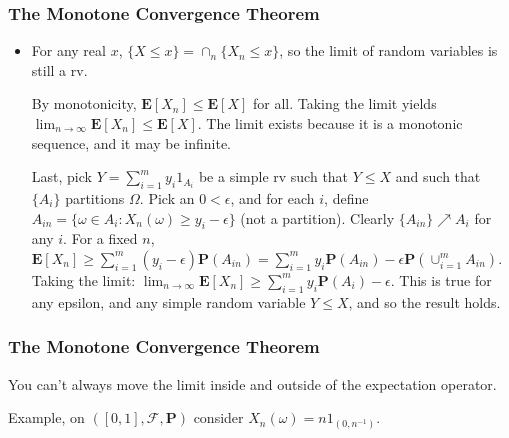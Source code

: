 \documentclass[handout]{beamer}
\newcommand{\BP}{\mathbf{P}}
\newcommand{\BE}{\mathbf{E}}
\begin{document}
\frame
{
  \frametitle{The Monotone Convergence Theorem}

\begin{itemize}

\item<1->[]
\begin{Proof} 
For any real $x$, $\{X \le x\} = \cap_n \{X_n \le x\}$, so the limit of random variables is still a rv. 
\newline

By monotonicity, $\BE[X_n] \le \BE[X]$ for all. Taking the limit yields $\lim_{n \to \infty} \BE[X_n] \le \BE[X]$. The limit exists because it is a monotonic sequence, and it may be infinite.
\newline

Last, pick $Y = \sum_{i=1}^m y_i 1_{A_i}$ be a simple rv such that $Y \le X$ and such that $\{A_i\}$ partitions $\Omega$. Pick an $0 <\epsilon$, and for each $i$, define $A_{in} = \{\omega \in A_i : X_{n}(\omega) \ge y_i - \epsilon  \}$ (not a partition). Clearly $\{A_{in}\} \nearrow A_i$ for any $i$. For a fixed $n$, $\BE[X_n] \ge  \sum_{i=1}^m (y_i - \epsilon) \BP(A_{in}) = \sum_{i=1}^m y_i \BP(A_{in}) - \epsilon \BP(\cup_{i=1}^m A_{in})$. Taking the limit: $\lim_{n \to \infty} \BE[X_n] \ge \sum_{i=1}^m y_i \BP(A_{i}) - \epsilon$. This is true for any epsilon, and any simple random variable $Y \le X$, and so the result holds.

\end{Proof}

\end{itemize}
}

\frame
{
  \frametitle{The Monotone Convergence Theorem}

You can't always move the limit inside and outside of the expectation operator.
\newline

Example, on $([0,1],\mathcal{F},\BP)$ consider $X_n(\omega) = n 1_{(0,n^{-1})}$.
\newline

}
\end{document}
